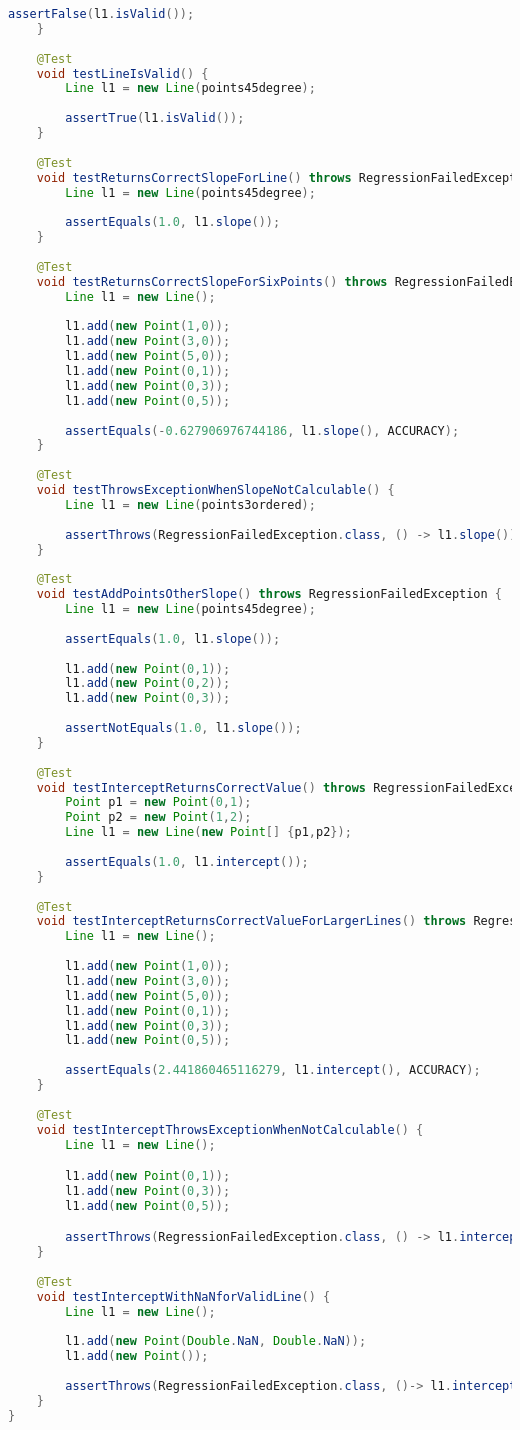 \begin{lstlisting}[language=java,
    label=lst:linetest,
    caption=JUnit Tests for Line
]
		assertFalse(l1.isValid());
	}
	
	@Test
	void testLineIsValid() {
		Line l1 = new Line(points45degree);
		
		assertTrue(l1.isValid());
	}
	
	@Test
	void testReturnsCorrectSlopeForLine() throws RegressionFailedException{
		Line l1 = new Line(points45degree);
		
		assertEquals(1.0, l1.slope());
	}
	
	@Test
	void testReturnsCorrectSlopeForSixPoints() throws RegressionFailedException {
		Line l1 = new Line();
		
		l1.add(new Point(1,0));		
		l1.add(new Point(3,0));
		l1.add(new Point(5,0));
		l1.add(new Point(0,1));
		l1.add(new Point(0,3));
		l1.add(new Point(0,5));
		
		assertEquals(-0.627906976744186, l1.slope(), ACCURACY);
	}
	
	@Test
	void testThrowsExceptionWhenSlopeNotCalculable() {
		Line l1 = new Line(points3ordered);
		
		assertThrows(RegressionFailedException.class, () -> l1.slope());
	}
	
	@Test
	void testAddPointsOtherSlope() throws RegressionFailedException {
		Line l1 = new Line(points45degree);
		
		assertEquals(1.0, l1.slope());
		
		l1.add(new Point(0,1));
		l1.add(new Point(0,2));
		l1.add(new Point(0,3));
		
		assertNotEquals(1.0, l1.slope());
	}
	
	@Test
	void testInterceptReturnsCorrectValue() throws RegressionFailedException {
		Point p1 = new Point(0,1);
		Point p2 = new Point(1,2);
		Line l1 = new Line(new Point[] {p1,p2});
		
		assertEquals(1.0, l1.intercept());
	}
	
	@Test
	void testInterceptReturnsCorrectValueForLargerLines() throws RegressionFailedException {
		Line l1 = new Line();
		
		l1.add(new Point(1,0));		
		l1.add(new Point(3,0));
		l1.add(new Point(5,0));
		l1.add(new Point(0,1));
		l1.add(new Point(0,3));
		l1.add(new Point(0,5));
		
		assertEquals(2.441860465116279, l1.intercept(), ACCURACY);
	}
	
	@Test
	void testInterceptThrowsExceptionWhenNotCalculable() {
		Line l1 = new Line();

		l1.add(new Point(0,1));
		l1.add(new Point(0,3));
		l1.add(new Point(0,5));

		assertThrows(RegressionFailedException.class, () -> l1.intercept());
	}
	
	@Test
	void testInterceptWithNaNforValidLine() {
		Line l1 = new Line();
		
		l1.add(new Point(Double.NaN, Double.NaN));
		l1.add(new Point());
		
		assertThrows(RegressionFailedException.class, ()-> l1.intercept());
	}
}

\end{lstlisting}